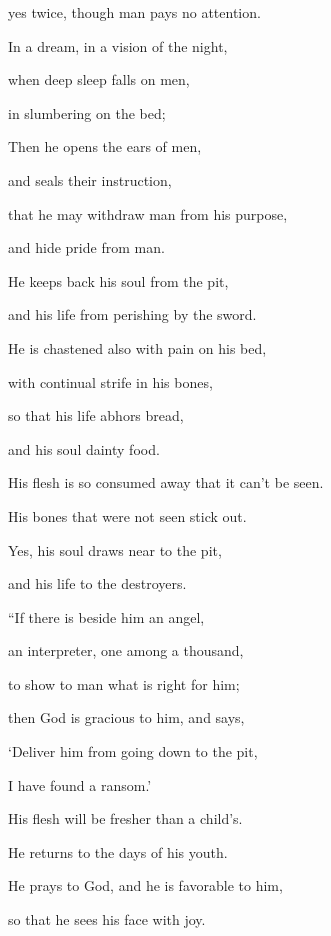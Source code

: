 {\par }{\QB yes twice, though man pays no attention.
\par }{\Q {}In a dream, in a vision of the night,
\par }{\QB when deep sleep falls on men,
\par }{\QB in slumbering on the bed;
\par }{\Q {}Then he opens the ears of men,
\par }{\QB and seals their instruction,
\par }{\Q {}that he may withdraw man from his purpose,
\par }{\QB and hide pride from man.
\par }{\Q {}He keeps back his soul from the pit,
\par }{\QB and his life from perishing by the sword.
\par }{\BB \par }{\Q {}He is chastened also with pain on his bed,
\par }{\QB with continual strife in his bones,
\par }{\Q {}so that his life abhors bread,
\par }{\QB and his soul dainty food.
\par }{\Q {}His flesh is so consumed away that it can’t be seen.
\par }{\QB His bones that were not seen stick out.
\par }{\Q {}Yes, his soul draws near to the pit,
\par }{\QB and his life to the destroyers.
\par }{\BB \par }{\Q {}“If there is beside him an angel,
\par }{\QB an interpreter, one among a thousand,
\par }{\QB to show to man what is right for him;
\par }{\Q {}then God is gracious to him, and says,
\par }{\QB ‘Deliver him from going down to the pit,
\par }{\QB I have found a ransom.’
\par }{\Q {}His flesh will be fresher than a child’s.
\par }{\QB He returns to the days of his youth.
\par }{\Q {}He prays to God, and he is favorable to him,
\par }{\QB so that he sees his face with joy.
}
